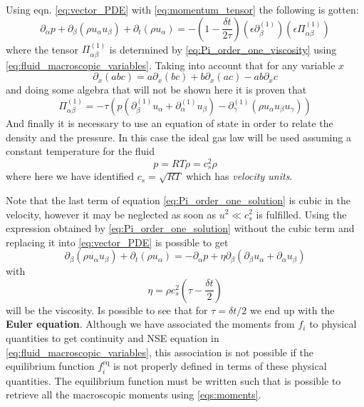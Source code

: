 Using eqn. \ref{eq:vector_PDE} with \ref{eq:momentum_tensor} the following is gotten:
\begin{equation}
    \partial_\alpha p + \partial_\beta(\rho u_\alpha u_\beta) + \partial_t (\rho u_\alpha) = -\left(1 - \frac{\delta t}{2\tau}\right)\left(\epsilon\partial_\beta^{(1)}\right)\left(\epsilon\Pi_{\alpha\beta}^{(1)}\right)
\end{equation}
where the tensor $\Pi_{\alpha\beta}^{(1)}$ is determined by \ref{eq:Pi_order_one_viscosity} using \ref{eq:fluid_macroscopic_variables}. Taking into account that for any variable $x$
\begin{equation}
    \partial_x(abc) = a\partial_x(bc) + b\partial_x(ac) - ab\partial_xc
\end{equation}
and doing some algebra that will not be shown here it is proven that 
\begin{equation}\label{eq:Pi_order_one_solution}
    \Pi_{\alpha\beta}^{(1)} = -\tau\left(p(\partial_\beta^{(1)}u_\alpha + \partial_\alpha^{(1)}u_\beta) - \partial_\gamma^{(1)}(\rho u_\alpha u_\beta u_\gamma)\right)
\end{equation}
And finally it is necessary to use an equation of state in order to relate the density and the pressure. In this case the ideal gas law will be used assuming a constant temperature for the fluid
\begin{equation}\label{eq:equation_state}
    p = RT\rho = c_s^2\rho
\end{equation}
where here we have identified $c_s = \sqrt{RT}$ which has \textit{velocity units}. 

Note that the last term of equation \ref{eq:Pi_order_one_solution} is cubic in the velocity, however it may be neglected as soon as $u^2 \ll c_s^2$ is fulfilled. Using the expression obtained by \ref{eq:Pi_order_one_solution} without the cubic term and replacing it into \ref{eq:vector_PDE} is possible to get
\begin{equation}\label{eq:NSE_fromLB}
    \partial_\beta(\rho u_\alpha u_\beta) + \partial_t(\rho u_\alpha) = -\partial_\alpha p + \eta\partial_\beta(\partial_\beta u_\alpha + \partial_\alpha u_\beta)
\end{equation}
with
\begin{equation}\label{eq:viscosity_tau_p}
    \eta = \rho c_s^2\left(\tau - \frac{\delta t}{2}\right)
\end{equation}
will be the viscosity. Is possible to see that for $\tau = \delta t/2$ we end up with the \textbf{Euler equation}. Although we have associated the moments from $f_i$ to physical quantities to get continuity and NSE equation in \ref{eq:fluid_macroscopic_variables}, this association is not possible if the equilibrium function $f_i^{\text{eq}}$ is not properly defined in terms of these physical quantities. The equilibrium function must be written such that is possible to retrieve all the macroscopic moments using \ref{eqs:moments}. 

